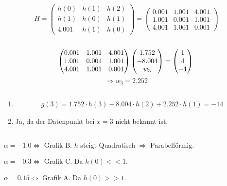 \documentclass[DIN, pagenumber=false, fontsize=11pt, parskip=half]{scrartcl}
\begin{document}
    \subsection{}
    \begin{equation*}
        H = \begin{pmatrix} h(0) & h(1) & h(2) \\ h(1) & h(0) & h(1) \\ 4.001 & h(1) & h(0) \end{pmatrix}
            = \begin{pmatrix} 0.001 & 1.001 & 4.001 \\ 1.001 & 0.001 & 1.001 \\ 4.001 & 1.001 & 0.001 \end{pmatrix}
    \end{equation*}

    \subsection{}
    \begin{equation*}
        \begin{pmatrix} 0.001 & 1.001 & 4.001 \\ 1.001 & 0.001 & 1.001 \\ 4.001 & 1.001 & 0.001 \end{pmatrix}
            \begin{pmatrix} 1.752 \\ -8.004 \\ w_3\end{pmatrix} = \begin{pmatrix} 1 \\ 4 \\ -1 \end{pmatrix} \\
    \end{equation*}
    \begin{equation*}
            \Rightarrow w_3 = 2.252
    \end{equation*}

    \subsection{}
    \begin{enumerate}[label=\alph*)]
        \item
            \begin{eqnarray*}
                g(3) = 1.752 \cdot  h(3) - 8.004 \cdot h(2) + 2.252 \cdot h(1) = -14 
            \end{eqnarray*}
        \item
            Ja, da der Datenpunkt bei $x=3$ nicht bekannt ist.
    \end{enumerate}

    \subsection{}
    $\alpha = -1.0 \Leftrightarrow$ Grafik B. $h$ steigt Quadratisch $\Rightarrow$ Parabelförmig.

    $\alpha = -0.3 \Leftrightarrow$ Grafik C. Da $h(0) << 1$.

    $\alpha = 0.15 \Leftrightarrow$ Grafik A. Da $h(0) >> 1$.
\end{document}
